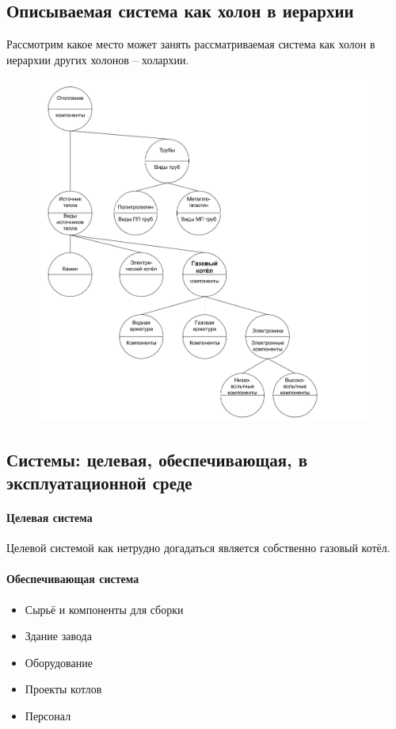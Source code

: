 \documentclass[bibliography=totocnumbered]{scrartcl}
\begin{document}
\subsection{Описываемая система как холон в иерархии}
Рассмотрим какое место может занять рассматриваемая система как холон в иерархии других холонов -- холархии.
\begin{figure}
  \centering \includegraphics[scale=0.5]{hol.png}
\end{figure}
\subsection{Системы: целевая, обеспечивающая, в эксплуатационной среде}

\paragraph{Целевая система}
Целевой системой как нетрудно догадаться является собственно газовый котёл.

\paragraph{Обеспечивающая система}
\begin{itemize}
  \item Сырьё и компоненты для сборки
  \item Здание завода
  \item Оборудование
  \item Проекты котлов
  \item Персонал
\end{itemize}
\end{document}
